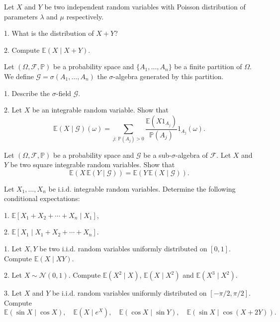 \begin{exercise}
Let $X$ and $Y$ be two independent random variables with Poisson distribution of parameters $\lambda$ and $\mu$ respectively.

1. What is the distribution of $X+Y$?  

2. Compute $\mathbb{E}(X \mid X+Y)$.
\end{exercise}



\begin{exercise}
Let $(\Omega,\mathcal{F},\mathbb{P})$ be a probability space and $\{A_1, \ldots, A_n\}$ be a finite partition of $\Omega$. We define $\mathcal{G} = \sigma(A_1, \ldots, A_n)$ the $\sigma$-algebra generated by this partition.  

1. Describe the $\sigma$-field $\mathcal{G}$.  

2. Let $X$ be an integrable random variable. Show that
\[
\mathbb{E}(X \mid \mathcal{G})(\omega) = \sum_{j:\,\mathbb{P}(A_j) > 0} \frac{\mathbb{E}(X1_{A_j})}{\mathbb{P}(A_j)} 1_{A_j}(\omega).
\]
\end{exercise}



\begin{exercise}
Let $(\Omega,\mathcal{F},\mathbb{P})$ be a probability space and $\mathcal{G}$ be a sub-$\sigma$-algebra of $\mathcal{F}$. Let $X$ and $Y$ be two square integrable random variables. Show that
\[
\mathbb{E}(X \, \mathbb{E}(Y \mid \mathcal{G})) = \mathbb{E}(Y \, \mathbb{E}(X \mid \mathcal{G})).
\]
\end{exercise}

\begin{exercise}
Let $X_1, \ldots, X_n$ be i.i.d. integrable random variables. Determine the following conditional expectations:  

1. $\mathbb{E}[X_1 + X_2 + \cdots + X_n \mid X_1]$,  

2. $\mathbb{E}[X_1 \mid X_1 + X_2 + \cdots + X_n]$.
\end{exercise}

\begin{exercise}
1. Let $X,Y$ be two i.i.d. random variables uniformly distributed on $[0,1]$. Compute $\mathbb{E}(X \mid XY)$.  

2. Let $X \sim \mathcal{N}(0,1)$. Compute $\mathbb{E}(X^2 \mid X)$, $\mathbb{E}(X \mid X^2)$ and $\mathbb{E}(X^3 \mid X^2)$.  

3. Let $X$ and $Y$ be i.i.d. random variables uniformly distributed on $[-\pi/2, \pi/2]$. Compute
\[
\mathbb{E}(\sin X \mid \cos X), \quad \mathbb{E}(X \mid e^X), \quad \mathbb{E}(\cos X \mid \sin Y), \quad \mathbb{E}(\sin X \mid \cos(X+2Y)).
\]
\end{exercise}


